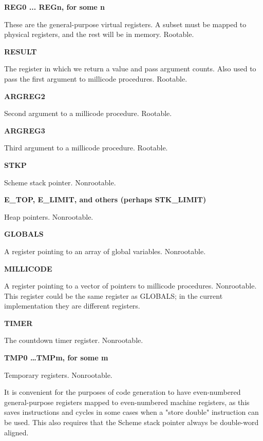 \begin{description}

\item {\bf REG0 ... REGn, for some n}

These are the general-purpose virtual registers. A subset must be
mapped to physical registers, and the rest will be in memory.
Rootable.

\item {\bf RESULT}

The register in which we return a value and pass argument counts. Also used
to pass the first argument to millicode procedures. Rootable.

\item {\bf ARGREG2}

Second argument to a millicode procedure. Rootable.

\item {\bf ARGREG3}

Third argument to a millicode procedure. Rootable.

\item {\bf STKP}

Scheme stack pointer. Nonrootable.

\item {\bf E\_TOP, E\_LIMIT, and others (perhaps STK\_LIMIT)}

Heap pointers. Nonrootable.

\item {\bf GLOBALS}

A register pointing to an array of global variables. Nonrootable.

\item {\bf MILLICODE}

A register pointing to a vector of pointers to millicode procedures. 
Nonrootable. This register could be the same register as GLOBALS; in the
current implementation they are different registers.

\item {\bf TIMER}

The countdown timer register. Nonrootable.

\item {\bf TMP0 \ldots TMPm, for some m}

Temporary registers. Nonrootable.
\end{description}

It is convenient for the purposes of code generation to have
even-numbered general-purpose registers mapped to even-numbered
machine registers, as this saves instructions and cycles in some cases
when a "store double" instruction can be used. This also requires that
the Scheme stack pointer always be double-word aligned.

